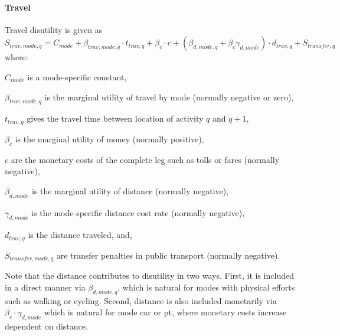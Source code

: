 \paragraph{Travel} Travel disutility is given as 
\begin{equation}
\label{eq:tdisutility}
S_{trav, mode, q} = C_{mode} + \beta_{trav, mode, q} \cdot t_{trav, q} + \beta_{c} \cdot c  + (\beta_{d, mode, q} + \beta_{c} \gamma_{d, mode}) \cdot d_{trav,q} + S_{transfer,q} \,
\end{equation} 
where:
\begin{compactitem} 
\item $C_{mode}$ is a mode-specific constant,
\item $\beta_{trav, mode, q}$ is the marginal utility of travel by mode (normally negative or zero),
\item $t_{trav, q}$ gives the travel time between location of activity $q$ and $q+1$,
\item $\beta_{c}$ is the marginal utility of money (normally positive),
\item $c$ are the monetary costs of the complete leg such as tolls or fares (normally negative),
\item $\beta_{d, mode}$ is the  marginal utility of distance (normally negative),
\item $\gamma_{d, mode}$ is the mode-specific distance cost rate (normally negative),
\item $d_{trav, q}$ is the distance traveled, and,
\item $S_{transfer, mode, q}$ are transfer penalties in public transport (normally negative).
\end{compactitem}
%
Note that the distance contributes to disutility in two ways. First, it is included in a direct manner via $\beta_{d, mode,q}$, which is natural for modes with physical efforts such as walking or cycling. Second, distance is also included monetarily via $\beta_c \cdot \gamma_{d, mode}$ which is natural for mode car or pt, where monetary costs increase dependent on distance.




